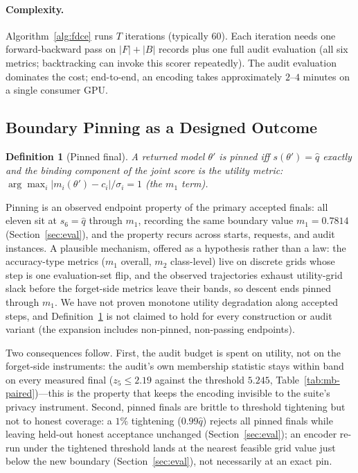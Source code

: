 \documentclass[lettersize,journal]{IEEEtran}
\newtheorem{definition}{Definition}
\begin{document}
\paragraph*{Complexity.} Algorithm~\ref{alg:fdce} runs $T$
iterations (typically 60). Each iteration needs one
forward-backward pass on $|F| + |B|$ records plus one full
audit evaluation (all six metrics; backtracking can invoke
this scorer repeatedly). The audit evaluation dominates the
cost; end-to-end, an encoding takes approximately $2$--$4$
minutes on a single consumer GPU.



\subsection{Boundary Pinning as a Designed Outcome}
\label{sec:pinning}

\begin{definition}[Pinned final]
\label{def:pinned}
A returned model $\theta'$ is \emph{pinned} iff
$s(\theta') = \hat q$ exactly and the binding component of the
joint score is the utility metric: $\arg\max_i
|m_i(\theta')-c_i|/\sigma_i = 1$ (the $m_1$ term).
\end{definition}

Pinning is an observed endpoint property of the primary
accepted finals: all eleven sit at $s_6 = \hat q$ through
$m_1$, recording the same boundary value $m_1 = 0.7814$
(Section~\ref{sec:eval}), and the property recurs across
starts, requests, and audit instances. A plausible mechanism,
offered as a hypothesis rather than a law: the accuracy-type
metrics ($m_1$ overall, $m_2$ class-level) live on discrete
grids whose step is one evaluation-set flip, and the observed
trajectories exhaust utility-grid slack before the forget-side
metrics leave their bands, so descent ends pinned through
$m_1$. We have not proven monotone utility degradation along
accepted steps, and Definition~\ref{def:pinned} is not claimed
to hold for every construction or audit variant (the
expansion includes non-pinned, non-passing endpoints).

Two consequences follow. First, the audit budget is spent on
utility, not on the forget-side instruments: the audit's own
membership statistic stays within band on every measured final
($z_5 \le 2.19$ against the threshold $5.245$,
Table~\ref{tab:mb-paired})---this is the property that keeps
the encoding invisible to the suite's privacy instrument.
Second, pinned finals are brittle to threshold tightening but
not to honest coverage: a $1\%$ tightening
($0.99\hat q$) rejects all pinned finals while leaving held-out
honest acceptance unchanged (Section~\ref{sec:eval}); an
encoder re-run under the tightened threshold lands at the
nearest feasible grid value just below the new boundary
(Section~\ref{sec:eval}), not necessarily at an exact pin.
\end{document}
